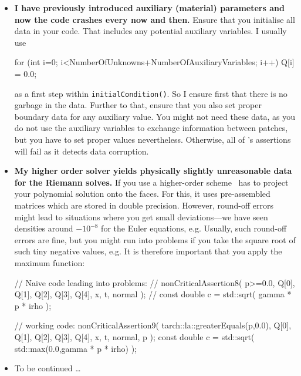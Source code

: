 \begin{itemize}
  \item \textbf{I have previously introduced auxiliary (material) parameters
  and now the code crashes every now and then.}
  Ensure that you initialise all data in your code. That includes any potential
  auxiliary variables. I usually use
  \begin{code}
for (int i=0; i<NumberOfUnknowns+NumberOfAuxiliaryVariables; i++) {
  Q[i] = 0.0;
}
  \end{code}
  as a first step within \texttt{initialCondition()}. So I ensure first that
  there is no garbage in the data. Further to that, ensure that you also set
  proper boundary data for any auxiliary value. You might not need these data, 
  as you do not use the auxiliary variables to exchange information between
  patches, but you have to set proper values nevertheless. Otherwise, all of
  \Peano's assertions will fail as it detects data corruption.
  \item \textbf{My higher order solver yields physically slightly unreasonable
  data for the Riemann solves.}
  If you use a higher-order scheme \ExaHyPE\ has to project your polynomial 
  solution onto the faces. For this, it uses pre-assembled matrices which are
  stored in double precision. However, round-off errors might lead to situations
  where you get small deviations---we have seen densities around $-10^{-8}$ for
  the Euler equations, e.g. Usually, such round-off errors are fine, but you
  might run into problems if you take the square root of such tiny negative
  values, e.g. It is therefore important that you apply the maximum function:
  \begin{code}
// Naive code leading into problems:  
// nonCriticalAssertion8( p>=0.0, Q[0], Q[1], Q[2], Q[3], Q[4], x, t, normal );
// const double c   = std::sqrt( gamma * p * irho );

// working code:
nonCriticalAssertion9( tarch::la::greaterEquals(p,0.0), Q[0], Q[1], Q[2], Q[3], Q[4], x, t, normal, p );
const double c   = std::sqrt( std::max(0.0,gamma * p * irho) );
  \end{code}
  \item To be continued \dots
\end{itemize}
